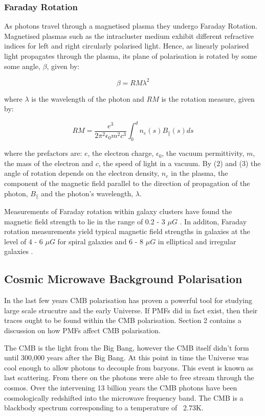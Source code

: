 \subsubsection{Faraday Rotation}

As photons travel through a magnetised plasma they undergo Faraday Rotation. Magnetised plasmas such as the intracluster medium exhibit different refractive indices for left and right circularly polarised light. Hence, as linearly polarised light propagates through the plasma, its plane of polarisation is rotated by some some angle, $\beta$, given by:

\begin{equation}
\beta = RM\lambda^2
\end{equation}

where $\lambda$ is the wavelength of the photon and $RM$ is the rotation measure, given by:

\begin{equation}
RM = \frac{e^3}{2\pi ^2 \epsilon_0 m^2 c^3}\int_{0}^{d} n_e(s) B_{\|}(s) ds
\end{equation}

where the prefactors are: $e$, the electron charge, $\epsilon_0$, the vacuum permittivity, $m$, the mass of the electron and $c$, the speed of light in a vacuum. By (2) and (3) the angle of rotation depends on the electron density, $n_e$ in the plasma, the component of the magnetic field parallel to the direction of propagation of the photon, $B_{\|}$ and the photon's wavelength, $\lambda$.

Measurements of Faraday rotation within galaxy clusters have found the magnetic field strength to lie in the range of 0.2 - 3 $\mu G$ \cite{Widrow:2002ud}. In additon, Faraday rotation measurements yield typical magnetic field strengths in galaxies at the level of 4 - 6 $\mu G$ for spiral galaxies and 6 - 8 $\mu G$ in elliptical and irregular galaxies \cite{Widrow:2002ud}.

\subsection{Cosmic Microwave Background Polarisation}
In the last few years CMB polarisation has proven a powerful tool for studying large scale strucutre and the early Universe. If PMFs did in fact exist, then their traces ought to be found within the CMB polarisation. Section 2 contains a discussion on how PMFs affect CMB polarisation.

The CMB is the light from the Big Bang, however the CMB itself didn't form until 300,000 years after the Big Bang. At this point in time the Universe was cool enough to allow photons to decouple from baryons. This event is known as last scattering. From there on the photons were able to free stream through the cosmos. Over the intervening 13 billion years the CMB photons have been cosmologically redshifted into the microwave frequency band. The CMB is a blackbody spectrum corresponding to a temperature of ~2.73K.

